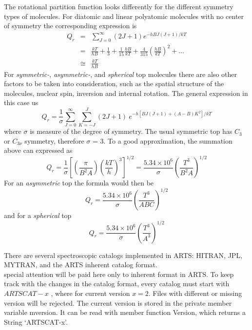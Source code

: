 {The rotational partition function looks differently for the different
symmetry types of molecules.
For diatomic and linear  polyatomic molecules with no center of
symmetry the corresponding expression is 
\begin{eqnarray}
Q_r & = & \sum_{J=0}^\infty (2J+1)e^{-hBJ(J+1)/kT}\nonumber\\
   & = & \frac{kT}{hB}+\frac{1}{3}+\frac{1}{15}\frac{hB}{kT}+\frac{4}{315}\left(\frac{hB}{kT}\right)^2+...\nonumber\\
   & \cong & \frac{kT}{hB}
\label{}
\end{eqnarray}
For {\it{symmetric-}}, {\it{asymmetric-}}, and {\it{spherical}} top molecules there are also
other factors to be taken into consideration, such as the
spatial structure of the molecules, nuclear spin, inversion and
internal rotation. The general expression in this case us
\begin{equation}
Q_r  =  \frac{1}{\sigma}\sum_{J=0}^\infty \sum_{K=-J}^{J}(2J+1)~e^{-h[BJ(J+1)+(A-B)K^2]/kT}
\label{}
\end{equation}
where $\sigma$ is measure of the degree of symmetry. The usual
symmetric top has $C_3$ or $C_{3\nu}$ symmetry, therefore $\sigma$ = 3. To a good
approximation, the summation above can expressed as
\begin{equation}
Q_r  = 
\frac{1}{\sigma}\left[\left(\frac{\pi}{B^2A}\right)\left(\frac{kT}{h}\right)^3\right]^{1/2}=
\frac{5.34\times 10^6}{\sigma}\left(\frac{T^3}{B^{2}A}\right)^{1/2}
\label{}
\end{equation}
For an  {\it{asymmetric}} top the formula would then be 
\begin{equation}
Q_r = \frac{5.34\times 10^6}{\sigma}\left(\frac{T^3}{ABC}\right)^{1/2}
\label{}
\end{equation}
and for a {\it{spherical}} top
\begin{equation}
Q_r = \frac{5.34\times 10^6}{\sigma}\left(\frac{T^3}{A^3}\right)^{1/2}
\label{}
\end{equation}




There are several spectroscopic catalogs implemented in ARTS: HITRAN,
JPL, MYTRAN, and the ARTS inherent catalog format.\\
special attention will be paid here only to inherent format in ARTS. 
To keep track with the changes in the catalog format, every catalog
must start with $ARTSCAT-x$ , where for current version $x=2$.
Files with different or missing version will be rejected. The current version is stored in the private member variable mversion. It can be read with member function Version, which returns a String `ARTSCAT-x'. 

}
